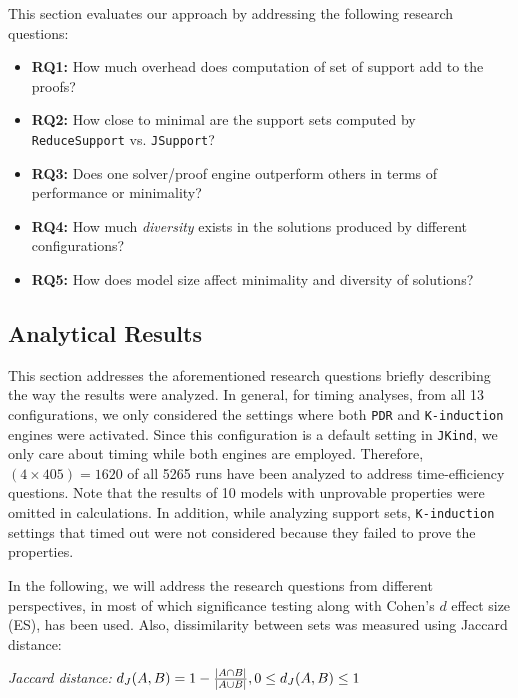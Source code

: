 This section evaluates our approach by addressing the following research questions:

\begin{itemize}
    \item \textbf{RQ1:} How much overhead does computation of set of support add to the proofs?
    \item \textbf{RQ2:} How close to minimal are the support sets computed by \texttt{ReduceSupport} vs. \texttt{JSupport}?
    \item \textbf{RQ3:} Does one solver/proof engine outperform others in terms of performance or minimality?
    \item \textbf{RQ4:} How much {\em diversity} exists in the solutions produced by different configurations?
    \item \textbf{RQ5:} How does model size affect minimality and diversity of solutions?
\end{itemize}

\subsection{Analytical Results}
\label{sec:res}
This section addresses the aforementioned research questions briefly describing the way the results were analyzed. In general, for timing analyses, from all 13 configurations, we only considered the settings where both \texttt{PDR} and \texttt{K-induction} engines were activated. Since this configuration is a default setting in \texttt{JKind}, we only care about timing while both engines are employed. Therefore, $(4 \times 405) = 1620$ of all 5265 runs have been analyzed to address time-efficiency questions.
Note that  the results of 10 models with unprovable properties were omitted in calculations. In addition,
 while analyzing support sets, \texttt{K-induction} settings that timed out were not considered because they failed to prove the properties.

In the following, we will address the research questions from different perspectives, in most of which significance testing along with Cohen's $d$ effect size (ES), has been used. Also, dissimilarity between sets was measured using Jaccard distance:
\begin{definition}{\emph{Jaccard distance:}}
  \label{def:dj}
  $d_J(\small{A}, \small{B}) = 1 - \frac{|A \cap B|}{|A \cup B|} ,\\ 0 \leq d_J(\small{A}, \small{B}) \leq 1$
\end{definition}

